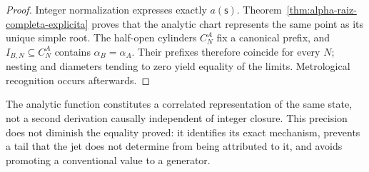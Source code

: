 \begin{proof}
Integer normalization expresses exactly \(a(\mathsf s)\).
Theorem~\ref{thm:alpha-raiz-completa-explicita} proves that the analytic
chart represents the same point as its unique simple root. The
half-open cylinders \(C_N^A\) fix a canonical prefix, and
\(I_{B,N}\subseteq C_N^A\) contains \(\alpha_B=\alpha_A\). Their
prefixes therefore coincide for every \(N\); nesting and diameters tending to
zero yield equality of the limits. Metrological
recognition occurs afterwards.
\end{proof}

The analytic function constitutes a correlated representation of the same
state, not a second derivation causally independent of integer closure.
This precision does not diminish the equality proved: it identifies its
exact mechanism, prevents a tail that the jet does not determine from being attributed to it,
and avoids promoting a conventional value to a generator.
